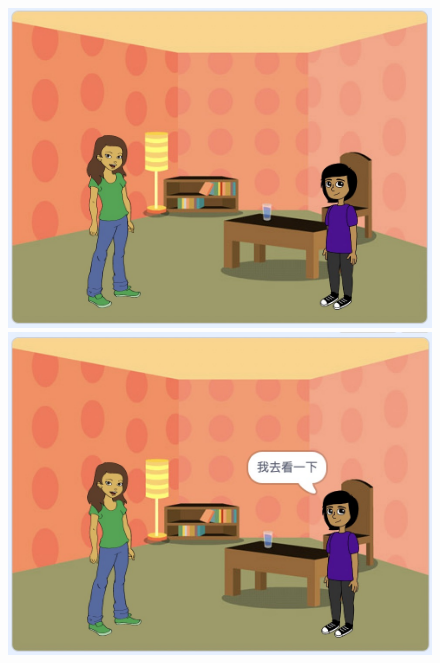 \documentclass[10pt, a4paper]{article}
\begin{document}
\begin{enumerate}
        \begin{figure}[htb]
            \begin{minipage}[t]{.23\textwidth}
                \centering
                \includegraphics[width=\textwidth]{37-1.jpg}
            \end{minipage}
            \begin{minipage}[t]{.23\textwidth}
                \centering
                \includegraphics[width=\textwidth]{37-2.jpg}
            \end{minipage}
            \begin{minipage}[t]{.23\textwidth}
                \centering

\end{minipage}
\end{figure}
\end{enumerate}
\end{document}
